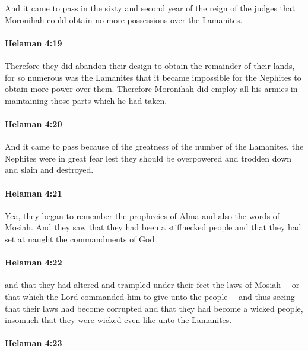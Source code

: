 			And it came to pass in the sixty and second year of the reign of the judges
			that Moronihah could obtain no more possessions over the Lamanites.

		\paragraph{Helaman 4:19} %
			\label{HELAMAN-4-19}

			Therefore they did abandon their design to obtain the remainder of their lands,
			for so numerous was the Lamanites
			that it became impossible for the Nephites to obtain more power over them.
			Therefore Moronihah did employ all his armies
			in maintaining those parts which he had taken.

		\paragraph{Helaman 4:20} %
			\label{HELAMAN-4-20}

			And it came to pass because of the greatness of the number of the Lamanites,
			the Nephites were in great fear lest they should be overpowered
			and trodden down and slain and destroyed.

		\paragraph{Helaman 4:21} %
			\label{HELAMAN-4-21}

			Yea, they began to remember the prophecies of Alma and also the words of Mosiah.
			And they saw that they had been a stiffnecked people
			and that they had set at naught the commandments of God

		\paragraph{Helaman 4:22} %
			\label{HELAMAN-4-22}

			and that they had altered and trampled under their feet the laws of Mosiah
			---or that which the Lord commanded him to give unto the people---
			and thus seeing that their laws had become corrupted
			and that they had become a wicked people,
			insomuch that they were wicked even like unto the Lamanites.

		\paragraph{Helaman 4:23} %
			\label{HELAMAN-4-23}

